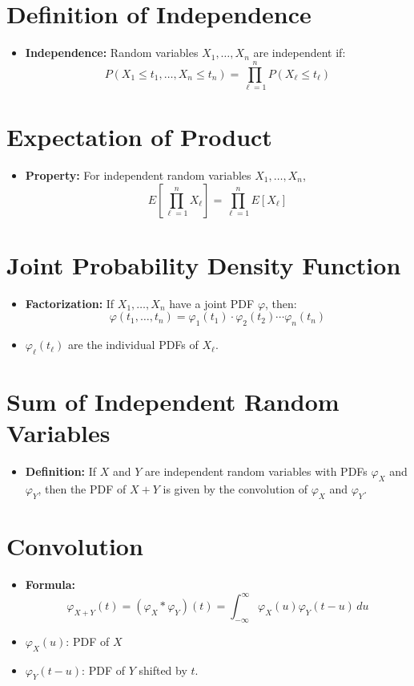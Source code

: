 \documentclass{article}
\begin{document}
\section*{Definition of Independence}
\begin{itemize}
    \item \textbf{Independence:} Random variables $X_1, \ldots, X_n$ are independent if:
    \[
    P(X_1 \leq t_1, \ldots, X_n \leq t_n) = \prod_{\ell=1}^{n} P(X_\ell \leq t_\ell)
    \]
\end{itemize}

\section*{Expectation of Product}
\begin{itemize}
    \item \textbf{Property:} For independent random variables $X_1, \ldots, X_n$,
    \[
    E\left[ \prod_{\ell=1}^{n} X_\ell \right] = \prod_{\ell=1}^{n} E[X_\ell]
    \]
\end{itemize}

\section*{Joint Probability Density Function}
\begin{itemize}
    \item \textbf{Factorization:} If $X_1, \ldots, X_n$ have a joint PDF $\varphi$, then:
    \[
    \varphi(t_1, \ldots, t_n) = \varphi_1(t_1) \cdot \varphi_2(t_2) \cdots \varphi_n(t_n)
    \]
    \item $\varphi_\ell(t_\ell)$ are the individual PDFs of $X_\ell$.
\end{itemize}

\section*{Sum of Independent Random Variables}
\begin{itemize}
    \item \textbf{Definition:} If $X$ and $Y$ are independent random variables with PDFs $\varphi_X$ and $\varphi_Y$, then the PDF of $X + Y$ is given by the convolution of $\varphi_X$ and $\varphi_Y$.
\end{itemize}

\section*{Convolution}
\begin{itemize}
    \item \textbf{Formula:}
    \[
    \varphi_{X+Y}(t) = (\varphi_X * \varphi_Y)(t) = \int_{-\infty}^{\infty} \varphi_X(u) \varphi_Y(t - u) \, du
    \]
    \item $\varphi_X(u)$: PDF of $X$ 
    \item $\varphi_Y(t - u)$: PDF of $Y$ shifted by $t$.
\end{itemize}
\end{document}
